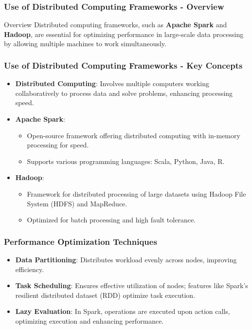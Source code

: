 \documentclass[aspectratio=169]{beamer}
\begin{document}
\begin{frame}[fragile]
    \frametitle{Use of Distributed Computing Frameworks - Overview}
    \begin{block}{Overview}
        Distributed computing frameworks, such as \textbf{Apache Spark} and \textbf{Hadoop}, are essential for optimizing performance in large-scale data processing by allowing multiple machines to work simultaneously.
    \end{block}
\end{frame}

\begin{frame}[fragile]
    \frametitle{Use of Distributed Computing Frameworks - Key Concepts}
    \begin{itemize}
        \item \textbf{Distributed Computing}: Involves multiple computers working collaboratively to process data and solve problems, enhancing processing speed.
        
        \item \textbf{Apache Spark}:
            \begin{itemize}
                \item Open-source framework offering distributed computing with in-memory processing for speed.
                \item Supports various programming languages: Scala, Python, Java, R.
            \end{itemize}
        
        \item \textbf{Hadoop}:
            \begin{itemize}
                \item Framework for distributed processing of large datasets using Hadoop File System (HDFS) and MapReduce.
                \item Optimized for batch processing and high fault tolerance.
            \end{itemize}
    \end{itemize}
\end{frame}

\begin{frame}[fragile]
    \frametitle{Performance Optimization Techniques}
    \begin{itemize}
        \item \textbf{Data Partitioning}: Distributes workload evenly across nodes, improving efficiency.
        
        \item \textbf{Task Scheduling}: Ensures effective utilization of nodes; features like Spark's resilient distributed dataset (RDD) optimize task execution.
        
        \item \textbf{Lazy Evaluation}: In Spark, operations are executed upon action calls, optimizing execution and enhancing performance.
    \end{itemize}
\end{frame}
\end{document}
